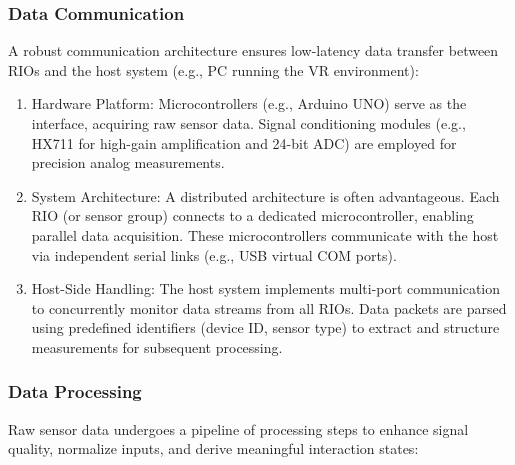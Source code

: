 \subsubsection{Data Communication}
A robust communication architecture ensures low-latency data transfer between RIOs and the host system (e.g., PC running the VR environment):

\begin{enumerate}
  \item Hardware Platform: Microcontrollers (e.g., Arduino UNO) serve as the interface, acquiring raw sensor data. Signal conditioning modules (e.g., HX711 for high-gain amplification and 24-bit ADC) are employed for precision analog measurements.

  \item System Architecture: A distributed architecture is often advantageous. Each RIO (or sensor group) connects to a dedicated microcontroller, enabling parallel data acquisition. These microcontrollers communicate with the host via independent serial links (e.g., USB virtual COM ports).
  
  \item Host-Side Handling: The host system implements multi-port communication to concurrently monitor data streams from all RIOs. Data packets are parsed using predefined identifiers (device ID, sensor type) to extract and structure measurements for subsequent processing.
\end{enumerate}

\subsubsection{Data Processing}
Raw sensor data undergoes a pipeline of processing steps to enhance signal quality, normalize inputs, and derive meaningful interaction states:

